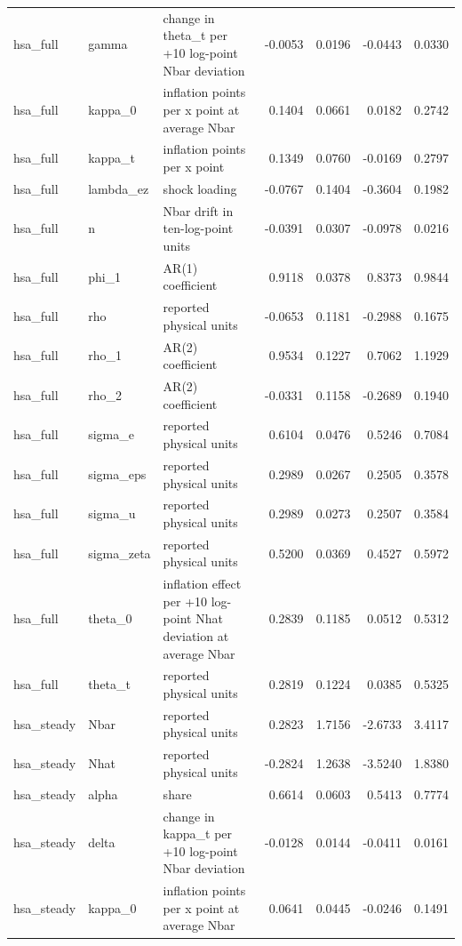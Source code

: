 \begin{tabular}{lllrrrr}
hsa\_full & gamma & change in theta\_t per +10 log-point Nbar deviation & -0.0053 & 0.0196 & -0.0443 & 0.0330 \\
hsa\_full & kappa\_0 & inflation points per x point at average Nbar & 0.1404 & 0.0661 & 0.0182 & 0.2742 \\
hsa\_full & kappa\_t & inflation points per x point & 0.1349 & 0.0760 & -0.0169 & 0.2797 \\
hsa\_full & lambda\_ez & shock loading & -0.0767 & 0.1404 & -0.3604 & 0.1982 \\
hsa\_full & n & Nbar drift in ten-log-point units & -0.0391 & 0.0307 & -0.0978 & 0.0216 \\
hsa\_full & phi\_1 & AR(1) coefficient & 0.9118 & 0.0378 & 0.8373 & 0.9844 \\
hsa\_full & rho & reported physical units & -0.0653 & 0.1181 & -0.2988 & 0.1675 \\
hsa\_full & rho\_1 & AR(2) coefficient & 0.9534 & 0.1227 & 0.7062 & 1.1929 \\
hsa\_full & rho\_2 & AR(2) coefficient & -0.0331 & 0.1158 & -0.2689 & 0.1940 \\
hsa\_full & sigma\_e & reported physical units & 0.6104 & 0.0476 & 0.5246 & 0.7084 \\
hsa\_full & sigma\_eps & reported physical units & 0.2989 & 0.0267 & 0.2505 & 0.3578 \\
hsa\_full & sigma\_u & reported physical units & 0.2989 & 0.0273 & 0.2507 & 0.3584 \\
hsa\_full & sigma\_zeta & reported physical units & 0.5200 & 0.0369 & 0.4527 & 0.5972 \\
hsa\_full & theta\_0 & inflation effect per +10 log-point Nhat deviation at average Nbar & 0.2839 & 0.1185 & 0.0512 & 0.5312 \\
hsa\_full & theta\_t & reported physical units & 0.2819 & 0.1224 & 0.0385 & 0.5325 \\
hsa\_steady & Nbar & reported physical units & 0.2823 & 1.7156 & -2.6733 & 3.4117 \\
hsa\_steady & Nhat & reported physical units & -0.2824 & 1.2638 & -3.5240 & 1.8380 \\
hsa\_steady & alpha & share & 0.6614 & 0.0603 & 0.5413 & 0.7774 \\
hsa\_steady & delta & change in kappa\_t per +10 log-point Nbar deviation & -0.0128 & 0.0144 & -0.0411 & 0.0161 \\
hsa\_steady & kappa\_0 & inflation points per x point at average Nbar & 0.0641 & 0.0445 & -0.0246 & 0.1491 \\

\end{tabular}
